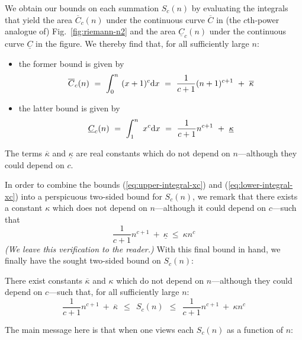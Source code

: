 We obtain our bounds on each summation $S_c(n)$ by evaluating the integrals that yield the area $\overline{C}_c(n)$ under the continuous curve $\overline{C}$ in (the $c$th-power analogue of) Fig.~\ref{fig:riemann-n2} and the area $\underline{C}_c(n)$ under the continuous curve $\underline{C}$ in the figure.  We thereby find that, for all sufficiently large $n$:
\begin{itemize}
\item
the former bound is given by
\begin{equation}
\label{eq:upper-integral-xc}
\overline{C}_c(n) \ = \
\int_0^n \ (x+1)^c {\rm d}x \ = \
 \frac{1}{c+1} (n+1)^{c+1} \ + \ \overline{\kappa}
\end{equation}

\medskip\item
the latter bound is given by
\begin{equation}
\label{eq:lower-integral-xc}
\underline{C}_c(n) \ = \
\int_1^n \ x^c {\rm d}x \ = \ \frac{1}{c+1} n^{c+1} \ + \ \underline{\kappa}
\end{equation}
\end{itemize}
The terms $\overline{\kappa}$ and $\underline{\kappa}$ are real constants which do not depend on $n$---although they could depend on $c$.

\smallskip

In order to combine the bounds (\ref{eq:upper-integral-xc}) and (\ref{eq:lower-integral-xc}) into a perspicuous two-sided bound for $S_c(n)$, we remark that there exists a constant $\kappa$ which does not depend on $n$---although it could depend on $c$---such that
\[ \frac{1}{c+1} n^{c+1} \ + \ \underline{\kappa} \ \leq \ \kappa n^c \]
{\em (We leave this verification to the reader.)}  With this final bound in hand, we finally have the sought two-sided bound on $S_c(n)$:

\begin{prop}
There exist constants $\overline{\kappa}$ and $\kappa$ which do not depend on $n$---although they could depend on $c$---such that, for all sufficiently large $n$:
\begin{equation}
\label{eq:bounds-sum-xc}
\frac{1}{c+1} n^{c+1} \ + \ \overline{\kappa}
  \ \ \leq \ \ S_c(n)
  \ \ \leq \ \ \frac{1}{c+1} n^{c+1} \ + \ \kappa n^c
\end{equation}
\end{prop}

\medskip

\noindent
The main message here is that when one views each $S_c(n)$ as a function of $n$:

